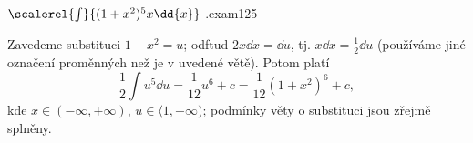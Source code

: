 \begin{mathexam}{\(\protect\scalerel{\int}{(1+x^2)^5x\dd{x}}\)
  \hfill\cite[s.~261]{Brabec1989}.}{exam125} 
  
  Zavedeme substituci \(1+x^2 = u\); odftud \(2x\dd{x} = \dd{u}\), tj. \(x\dd{x}=\frac{1}{2}\dd{u}\)
  (používáme jiné označení proměnných než je v uvedené větě). Potom platí 
  \begin{equation*}
    \frac{1}{2}\int u^5\dd{u} = \frac{1}{12}u^6 + c = \frac{1}{12}(1+x^2)^6 + c,
  \end{equation*}
  kde \(x\in(-\infty, +\infty)\), \(u\in\langle 1,+\infty)\); podmínky věty o substituci jsou
  zřejmě splněny.  
\end{mathexam}